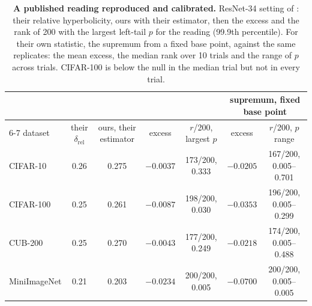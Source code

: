 \begin{table}[t]
\centering
\footnotesize
\setlength{\tabcolsep}{2.0pt}
\begin{tabular}{lcccccc}
\toprule
 & & & & & \multicolumn{2}{c}{supremum, fixed base point} \\
\cmidrule(lr){6-7}
dataset & their $\delta_{\text{rel}}$ & ours, their estimator & excess & $r$/200, largest $p$ & excess & $r$/200, $p$ range \\
\midrule
CIFAR-10 & 0.26 & 0.275 & $-0.0037$ & 173/200, 0.333 & $-0.0205$ & 167/200, 0.005--0.701 \\
CIFAR-100 & 0.25 & 0.261 & $-0.0087$ & 198/200, 0.030 & $-0.0353$ & 196/200, 0.005--0.299 \\
CUB-200 & 0.25 & 0.270 & $-0.0043$ & 177/200, 0.249 & $-0.0218$ & 174/200, 0.005--0.488 \\
MiniImageNet & 0.21 & 0.203 & $-0.0234$ & 200/200, 0.005 & $-0.0700$ & 200/200, 0.005--0.005 \\
\bottomrule
\end{tabular}
\caption{\textbf{A published reading reproduced and calibrated.} ResNet-34 setting of \citet{Khrulkov_2020_CVPR}: their relative hyperbolicity, ours with their estimator, then the excess and the rank of 200 with the largest left-tail $p$ for the reading (99.9th percentile). For their own statistic, the supremum from a fixed base point, against the same replicates: the mean excess, the median rank over 10 trials and the range of $p$ across trials. CIFAR-100 is below the null in the median trial but not in every trial. %
}
\label{tab:khrulkov}
\end{table}
